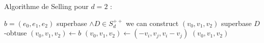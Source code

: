 
\begin{algorithm}

\caption{Algorithme de Selling pour $d = 2$ : }
\begin{algorithmic} 

\REQUIRE $b = (e_0, e_1, e_2) $ superbase $ \land D \in S_d^{++}$
\ENSURE we can construct $(v_0, v_1, v_2)$ superbase $D$-obtuse
\STATE $(v_0, v_1, v_2) \leftarrow b $ 
\STATE $(v_0, v_1, v_2) \leftarrow (- v_i, v_j, v_i - v_j )$
\ENDWHILE
\RETURN $(v_0, v_1, v_2)$

\end{algorithmic}
\end{algorithm}